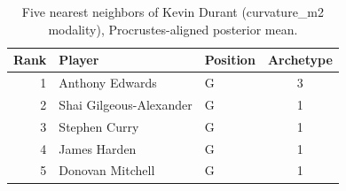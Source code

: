\begin{table}[htbp]
  \centering\small
  \begin{tabular}{rllc}
    \toprule
    Rank & Player & Position & Archetype \\
    \midrule
    1 & Anthony Edwards & G & 3 \\
    2 & Shai Gilgeous-Alexander & G & 1 \\
    3 & Stephen Curry & G & 1 \\
    4 & James Harden & G & 1 \\
    5 & Donovan Mitchell & G & 1 \\
    \bottomrule
  \end{tabular}
  \caption{Five nearest neighbors of Kevin Durant (curvature_m2 modality), Procrustes-aligned posterior mean.}
  \label{tab:Kevin_Durant_neighbors_curvature_m2}
\end{table}

